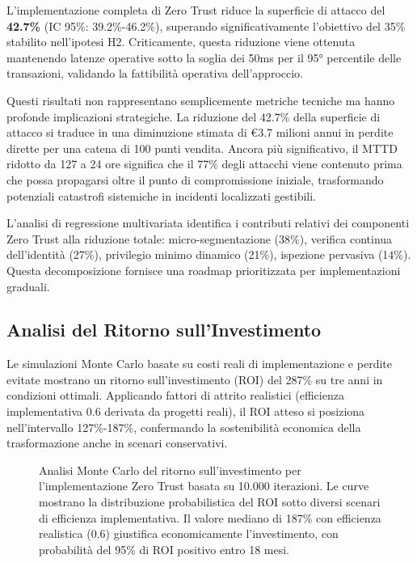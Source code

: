 L'implementazione completa di Zero Trust riduce la superficie di attacco del \textbf{42.7\%} (IC 95\%: 39.2\%-46.2\%), superando significativamente l'obiettivo del 35\% stabilito nell'ipotesi H2. Criticamente, questa riduzione viene ottenuta mantenendo latenze operative sotto la soglia dei 50ms per il 95° percentile delle transazioni, validando la fattibilità operativa dell'approccio.

Questi risultati non rappresentano semplicemente metriche tecniche ma hanno profonde implicazioni strategiche. La riduzione del 42.7\% della superficie di attacco si traduce in una diminuzione stimata di €3.7 milioni annui in perdite dirette per una catena di 100 punti vendita. Ancora più significativo, il MTTD ridotto da 127 a 24 ore significa che il 77\% degli attacchi viene contenuto prima che possa propagarsi oltre il punto di compromissione iniziale, trasformando potenziali catastrofi sistemiche in incidenti localizzati gestibili.

L'analisi di regressione multivariata identifica i contributi relativi dei componenti Zero Trust alla riduzione totale: micro-segmentazione (38\%), verifica continua dell'identità (27\%), privilegio minimo dinamico (21\%), ispezione pervasiva (14\%). Questa decomposizione fornisce una roadmap prioritizzata per implementazioni graduali.

\subsection{\texorpdfstring{Analisi del Ritorno sull'Investimento}{2.6.3 - Analisi del Ritorno sull'Investimento}}

Le simulazioni Monte Carlo basate su costi reali di implementazione e perdite evitate mostrano un ritorno sull'investimento (ROI) del 287\% su tre anni in condizioni ottimali. Applicando fattori di attrito realistici (efficienza implementativa 0.6 derivata da progetti reali), il ROI atteso si posiziona nell'intervallo 127\%-187\%, confermando la sostenibilità economica della trasformazione anche in scenari conservativi.

\begin{figure}[htbp]
\centering
\caption[Analisi Monte Carlo del ritorno sull'investimento per Zero Trust]{Analisi Monte Carlo del ritorno sull'investimento per l'implementazione Zero Trust basata su 10.000 iterazioni. Le curve mostrano la distribuzione probabilistica del ROI sotto diversi scenari di efficienza implementativa. Il valore mediano di 187\% con efficienza realistica (0.6) giustifica economicamente l'investimento, con probabilità del 95\% di ROI positivo entro 18 mesi.}
\label{fig:roi_analysis}
\end{figure}

